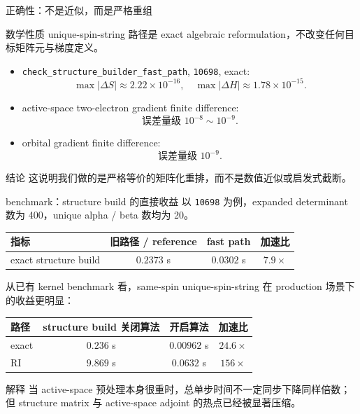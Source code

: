 \documentclass[aspectratio=169,professionalfonts]{ctexbeamer}
\begin{document}
\begin{frame}{正确性：不是近似，而是严格重组}
  \small
  \begin{block}{数学性质}
    unique-spin-string 路径是 exact algebraic reformulation，不改变任何目标矩阵元与梯度定义。
  \end{block}

  \begin{itemize}
    \item \texttt{check\_structure\_builder\_fast\_path}, \texttt{10698}, exact:
    \[
    \max |\Delta S| \approx 2.22\times 10^{-16},
    \quad
    \max |\Delta H| \approx 1.78\times 10^{-15}.
    \]
    \item active-space two-electron gradient finite difference:
    \[
    \text{误差量级 } 10^{-8}\sim 10^{-9}.
    \]
    \item orbital gradient finite difference:
    \[
    \text{误差量级 } 10^{-9}.
    \]
  \end{itemize}

  \begin{block}{结论}
    这说明我们做的是严格等价的矩阵化重排，而不是数值近似或启发式截断。
  \end{block}
\end{frame}

\begin{frame}{benchmark：structure build 的直接收益}
  \small
  以 \texttt{10698} 为例，expanded determinant 数为 400，unique alpha / beta 数均为 20。

  \vspace{0.5em}
  \begin{tabular}{lccc}
    \toprule
    指标 & 旧路径 / reference & fast path & 加速比 \\
    \midrule
    exact structure build & \(0.2373\) s & \(0.0302\) s & \(7.9\times\) \\
    \bottomrule
  \end{tabular}

  \vspace{0.8em}
  从已有 kernel benchmark 看，same-spin unique-spin-string 在 production 场景下的收益更明显：

  \vspace{0.4em}
  \begin{tabular}{lccc}
    \toprule
    路径 & structure build 关闭算法 & 开启算法 & 加速比 \\
    \midrule
    exact & \(0.236\) s & \(0.00962\) s & \(24.6\times\) \\
    RI & \(9.869\) s & \(0.0632\) s & \(156\times\) \\
    \bottomrule
  \end{tabular}

  \vspace{0.5em}
  \begin{block}{解释}
    当 active-space 预处理本身很重时，总单步时间不一定同步下降同样倍数；但 structure matrix 与 active-space adjoint 的热点已经被显著压缩。
  \end{block}
\end{frame}
\end{document}
